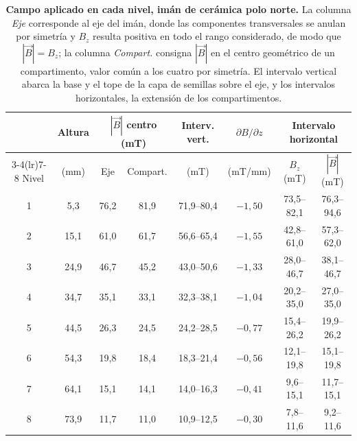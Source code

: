 \begin{table}[tbp]
\small
\setlength{\tabcolsep}{3pt}
    \centering
    \small
    \caption[Campo aplicado en cada nivel, imán de cerámica]{\textbf{Campo aplicado en cada nivel, imán de cerámica polo norte.} La columna \textit{Eje} corresponde al eje del imán, donde las componentes transversales se anulan por simetría y \(B_z\) resulta positiva en todo el rango considerado, de modo que \(|\vec{B}| = B_z\); la columna \textit{Compart.} consigna \(|\vec{B}|\) en el centro geométrico de un compartimento, valor común a los cuatro por simetría. El intervalo vertical abarca la base y el tope de la capa de semillas sobre el eje, y los intervalos horizontales, la extensión de los compartimentos.}
    \label{tab:dosis_ceramica}
    \begin{tabular}{cccccccc}
        \toprule
        & Altura & \multicolumn{2}{c}{\(|\vec{B}|\) centro (mT)} & Interv. vert. & \(\partial B/\partial z\) & \multicolumn{2}{c}{Intervalo horizontal} \\
        \cmidrule(lr){3-4}\cmidrule(lr){7-8}
        Nivel & (mm) & Eje & Compart. & (mT) & (mT/mm) & \(B_z\) (mT) & \(|\vec{B}|\) (mT) \\
        \midrule
        1 & 5{,}3  & 76{,}2 & 81{,}9 & 71{,}9--80{,}4 & \(-1{,}50\) & 73{,}5--82{,}1 & 76{,}3--94{,}6 \\
        2 & 15{,}1 & 61{,}0 & 61{,}7 & 56{,}6--65{,}4 & \(-1{,}55\) & 42{,}8--61{,}0 & 57{,}3--62{,}0 \\
        3 & 24{,}9 & 46{,}7 & 45{,}2 & 43{,}0--50{,}6 & \(-1{,}33\) & 28{,}0--46{,}7 & 38{,}1--46{,}7 \\
        4 & 34{,}7 & 35{,}1 & 33{,}1 & 32{,}3--38{,}1 & \(-1{,}04\) & 20{,}2--35{,}0 & 27{,}0--35{,}0 \\
        5 & 44{,}5 & 26{,}3 & 24{,}5 & 24{,}2--28{,}5 & \(-0{,}77\) & 15{,}4--26{,}2 & 19{,}9--26{,}2 \\
        6 & 54{,}3 & 19{,}8 & 18{,}4 & 18{,}3--21{,}4 & \(-0{,}56\) & 12{,}1--19{,}8 & 15{,}1--19{,}8 \\
        7 & 64{,}1 & 15{,}1 & 14{,}1 & 14{,}0--16{,}3 & \(-0{,}41\) & 9{,}6--15{,}1  & 11{,}7--15{,}1 \\
        8 & 73{,}9 & 11{,}7 & 11{,}0 & 10{,}9--12{,}5 & \(-0{,}30\) & 7{,}8--11{,}6  & 9{,}2--11{,}6 \\
        \bottomrule
    \end{tabular}
\end{table}

